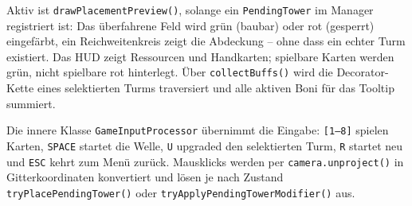 Aktiv ist \texttt{drawPlacementPreview()}, solange ein \texttt{PendingTower}
im Manager registriert ist: Das überfahrene Feld wird grün (baubar) oder rot
(gesperrt) eingefärbt, ein Reichweitenkreis zeigt die Abdeckung -- ohne dass
ein echter Turm existiert. Das HUD zeigt Ressourcen und Handkarten; spielbare
Karten werden grün, nicht spielbare rot hinterlegt. Über \texttt{collectBuffs()}
wird die Decorator-Kette eines selektierten Turms traversiert und alle
aktiven Boni für das Tooltip summiert.

Die innere Klasse \texttt{GameInputProcessor} übernimmt die Eingabe:
\texttt{[1--8]} spielen Karten, \texttt{SPACE} startet die Welle, \texttt{U}
upgraded den selektierten Turm, \texttt{R} startet neu und \texttt{ESC} kehrt
zum Menü zurück. Mausklicks werden per \texttt{camera.unproject()} in
Gitterkoordinaten konvertiert und lösen je nach Zustand
\texttt{tryPlace\-PendingTower()} oder \texttt{tryApply\-Pending\-Tower\-Modifier()} aus.
